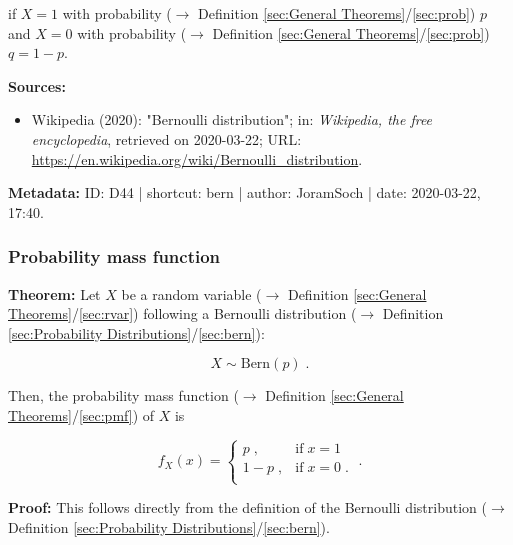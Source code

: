 \documentclass[a4paper,12pt,twoside]{book}
\begin{document}
if $X = 1$ with probability ($\rightarrow$ Definition \ref{sec:General Theorems}/\ref{sec:prob}) $p$ and $X = 0$ with probability ($\rightarrow$ Definition \ref{sec:General Theorems}/\ref{sec:prob}) $q = 1-p$.


\vspace{1em}
\textbf{Sources:}
\begin{itemize}
\item Wikipedia (2020): "Bernoulli distribution"; in: \textit{Wikipedia, the free encyclopedia}, retrieved on 2020-03-22; URL: \url{https://en.wikipedia.org/wiki/Bernoulli_distribution}.
\end{itemize}


\vspace{1em}
\textbf{Metadata:} ID: D44 | shortcut: bern | author: JoramSoch | date: 2020-03-22, 17:40.
\vspace{1em}



\subsubsection[\textbf{Probability mass function}]{Probability mass function} \label{sec:bern-pmf}
\setcounter{equation}{0}

\textbf{Theorem:} Let $X$ be a random variable ($\rightarrow$ Definition \ref{sec:General Theorems}/\ref{sec:rvar}) following a Bernoulli distribution ($\rightarrow$ Definition \ref{sec:Probability Distributions}/\ref{sec:bern}):

\begin{equation} \label{eq:bern-pmf-Bern}
X \sim \mathrm{Bern}(p) \; .
\end{equation}

Then, the probability mass function ($\rightarrow$ Definition \ref{sec:General Theorems}/\ref{sec:pmf}) of $X$ is

\begin{equation} \label{eq:bern-pmf-Bern-pmf}
f_X(x) = \left\{
\begin{array}{rl}
p \; , & \text{if} \; x = 1 \\
1-p \; , & \text{if} \; x = 0 \; . \\
\end{array}
\right. \; .
\end{equation}


\vspace{1em}
\textbf{Proof:} This follows directly from the definition of the Bernoulli distribution ($\rightarrow$ Definition \ref{sec:Probability Distributions}/\ref{sec:bern}).
\end{document}
